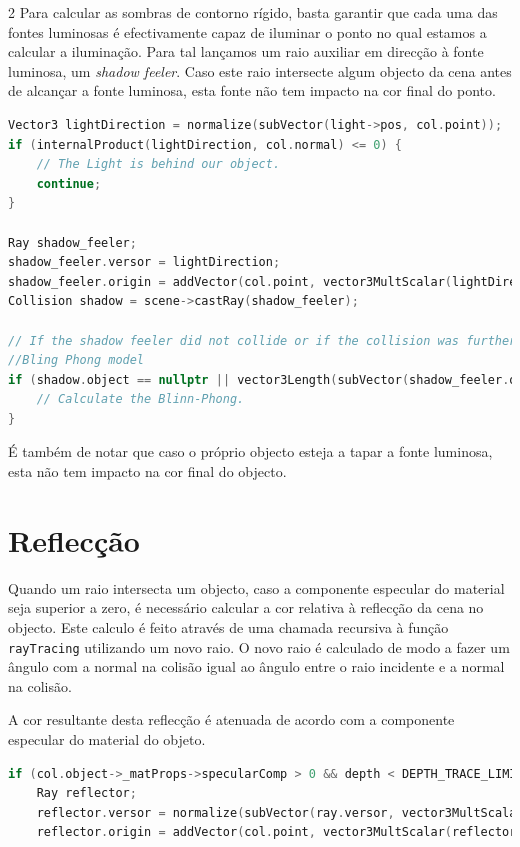 \documentclass{article}
\begin{document}
\begin{multicols}{2}
    Para calcular as sombras de contorno rígido, basta garantir que cada uma das fontes
    luminosas é efectivamente capaz de iluminar o ponto no qual estamos a calcular a
    iluminação. Para tal lançamos um raio auxiliar em direcção à fonte luminosa, um
    \textit{shadow feeler}. Caso este raio intersecte algum objecto da cena antes de
    alcançar a fonte luminosa, esta fonte não tem impacto na cor final do ponto.

\begin{lstlisting}[language=C++]
Vector3 lightDirection = normalize(subVector(light->pos, col.point));
if (internalProduct(lightDirection, col.normal) <= 0) {
    // The Light is behind our object.
    continue;
}

Ray shadow_feeler;
shadow_feeler.versor = lightDirection;
shadow_feeler.origin = addVector(col.point, vector3MultScalar(lightDirection, EPSILON));
Collision shadow = scene->castRay(shadow_feeler);

// If the shadow feeler did not collide or if the collision was further away than the light source.
//Bling Phong model
if (shadow.object == nullptr || vector3Length(subVector(shadow_feeler.origin, shadow.point)) > vector3Length(subVector(light->pos, col.point))) {
    // Calculate the Blinn-Phong.
}
\end{lstlisting}

    É também de notar que caso o próprio objecto esteja a tapar a fonte luminosa, esta não
    tem impacto na cor final do objecto.

    \section{Reflecção}
    
    Quando um raio intersecta um objecto, caso a componente especular do material
    seja superior a zero, é necessário calcular a cor relativa à reflecção da
    cena no objecto. Este calculo é feito através de uma chamada recursiva à função
    \verb|rayTracing| utilizando um novo raio. O novo raio é calculado de modo
    a fazer um ângulo com a normal na colisão igual ao ângulo entre o raio incidente
    e a normal na colisão.

    A cor resultante desta reflecção é atenuada de acordo com a componente especular
    do material do objeto.

\begin{lstlisting}[language=C++]
if (col.object->_matProps->specularComp > 0 && depth < DEPTH_TRACE_LIMIT) {
    Ray reflector;
    reflector.versor = normalize(subVector(ray.versor, vector3MultScalar(col.normal, 2 * internalProduct(ray.versor, col.normal))));
    reflector.origin = addVector(col.point, vector3MultScalar(reflector.versor, EPSILON));


\end{lstlisting}
\end{multicols}
\end{document}
